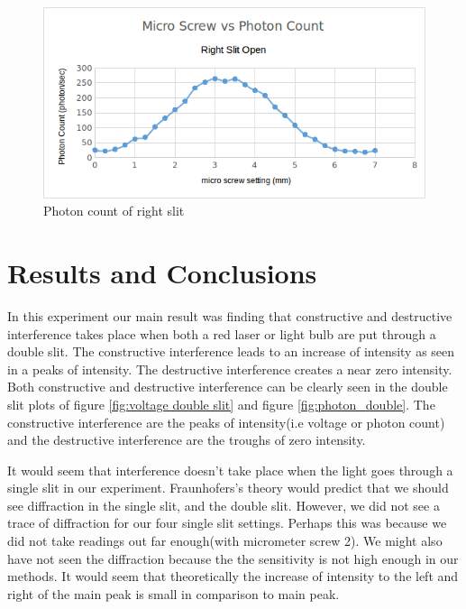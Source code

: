 \documentclass[12pt letterpaper]{article}
\begin{document}
\begin{figure}[!h]
  \caption{Photon count of right slit} 
  \centering
    \includegraphics[width=\textwidth]{photon_count_right_slit.png}
\end{figure}




\vspace*{60cm}

\section*{Results and Conclusions}

In this experiment our main result was finding that constructive and destructive interference takes place when both a red laser or light bulb are put through a double slit. The constructive interference leads to an increase of intensity as seen in a peaks of intensity. The destructive interference creates a near zero intensity. Both constructive and destructive interference can be clearly seen in the double slit plots of figure \ref{fig:voltage double slit} and figure \ref{fig:photon_double}. The constructive interference are the peaks of intensity(i.e voltage or photon count) and the destructive interference are the troughs of zero intensity. 

It would seem that interference doesn't take place when the light goes through a single slit in our experiment. Fraunhofers's theory would predict that we should see diffraction in the single slit, and the double slit. However, we did not see a trace of diffraction for our four single slit settings. Perhaps this was because we did not take readings out far enough(with micrometer screw 2). We might also have not seen the diffraction because the the sensitivity is not high enough in our methods. It would seem that theoretically the increase of intensity to the left and right of the main peak is small in comparison to main peak. 
\end{document}
